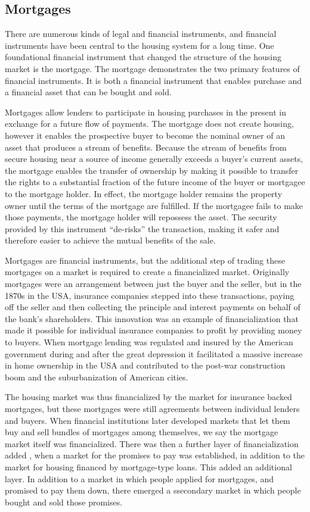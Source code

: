 \subsection{Mortgages}
There are numerous kinds of legal and financial instruments, and financial instruments have been central to the housing system for a long time. One foundational financial instrument that changed the structure of the housing market is the mortgage. The mortgage demonstrates the two primary features of financial instruments. It is both a financial instrument that enables purchase and a financial asset that can be bought and sold. 

Mortgages allow lenders to participate in housing purchases in the present in exchange for a future flow of payments. The mortgage does not create housing, however it enables the prospective buyer to become the nominal owner of an asset that produces a stream of benefits. Because the stream of benefits from secure housing near a source of income generally exceeds a buyer's current assets, the mortgage enables the transfer of ownership by making it possible to transfer the rights to a substantial fraction of the future income of the buyer or mortgagee to the mortgage holder. In effect, the mortgage holder remains the property owner until the terms of the mortgage are fulfilled.  If the mortgagee fails to make those payments, the mortgage holder will repossess the asset. The security provided by this instrument ``de-risks'' the transaction, making it safer and therefore easier to achieve the mutual benefits of the sale.

Mortgages are financial instruments, but the additional step of trading these mortgages on a market is required to create a financialized market. Originally mortgages were an arrangement between just the buyer and the seller, but in the 1870s in the USA, insurance companies stepped into these transactions, paying off the seller and then collecting the principle and interest payments on behalf of the bank's shareholders. This innovation was an example of financialization that made it possible for individual insurance companies to profit by providing money to buyers. When mortgage lending was regulated and insured  by the American government during and after the great depression it facilitated a massive increase in home ownership in the USA and contributed to the post-war construction boom and the suburbanization of American cities. 

The housing market was thus financialized by the market for insurance backed mortgages, but these mortgages were still agreements between individual lenders and buyers. When financial institutions later developed markets that let them buy and sell bundles of mortgages among themselves, we say the mortgage market itself was financialized. There was then a further layer of financialization added %
, when a market for the promises to pay was established, in addition to the market for housing financed by mortgage-type loans. This added an additional layer. In addition to a market in which people applied for mortgages, and promised to pay them down, there emerged a ssecondary market in which people bought and sold those promises. %

